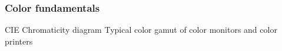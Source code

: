 \documentclass{beamer}
\begin{document}
\begin{frame}
\frametitle{Color fundamentals}
\begin{block}{CIE Chromaticity diagram}
\footnotesize{Typical color gamut of color monitors and color printers}
\end{block}
\end{frame}
\end{document}
